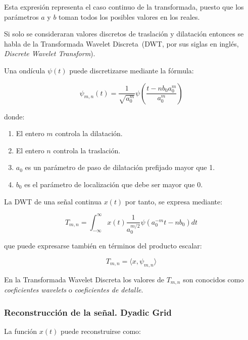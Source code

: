 Esta expresi\'on representa el caso continuo de la transformada, puesto que los par\'ametros $a$ y $b$ toman todos los posibles  valores en los reales. 


Si solo se consideraran valores discretos de traslaci\'on y dilataci\'on entonces se habla de la Transformada Wavelet Discreta~(DWT, por sus siglas en ingl\'es, \emph{Discrete Wavelet Transform}).


Una ond\'icula $\psi(t)$ puede discretizarse mediante la f\'ormula:

\begin{equation}\label{E:discretizacion_a_b}
	\psi_{m,n}(t) = \dfrac{1}{\sqrt{a_{0}^m}}
	\psi(\dfrac{t - n b_{0}a_{0}^m}{a_{0}^m})
\end{equation}

donde:

\begin{enumerate}
\item  El entero $m$ controla la dilataci\'on.
\item  El entero $n$ controla la traslaci\'on.
\item $a_0$ es un par\'ametro de paso de dilataci\'on prefijado mayor que 1.
\item $b_0$ es el par\'ametro de localizaci\'on que debe ser mayor que 0.
\end{enumerate}

La DWT de una se\~nal continua $x(t)$ por tanto, se expresa mediante: 

\begin{equation}\label{E:trans_discreta}
	T_{m,n} = \int_{-\infty}^{\infty} x(t)
	\dfrac{1}{a_{0}^{m/2}}
	\psi(a_{0}^{-m}t - nb_0) dt
\end{equation}

que puede expresarse tambi\'en en t\'erminos del producto escalar:

\begin{equation}\label{E:trans_discreta_inner}
	T_{m,n} = \langle x, \psi_{m,n}  \rangle
\end{equation}

En la Transformada Wavelet Discreta los valores de $T_{m,n}$ son conocidos como \emph{coeficientes wavelets} o \emph{coeficientes de detalle}.
  
  \subsubsection{Reconstrucci\'on de la se\~nal. Dyadic Grid}
  
 La funci\'on $x(t)$ puede reconstruirse como:
   
